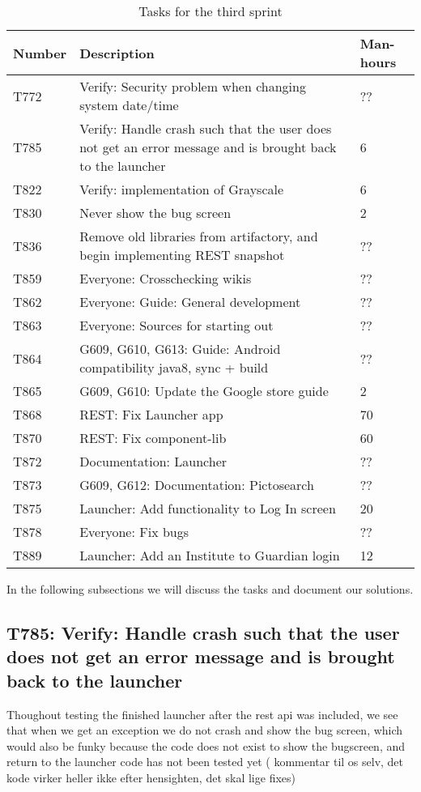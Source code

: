 \begin{table}[H]
\begin{centering}
\begin{tabular}{|l|p{9cm}|l|}
\hline
Number 	& Description & Man-hours \\ \hline
T772    & Verify: Security problem when changing system date/time & ??\\\hline
T785	& Verify: Handle crash such that the user does not get an error message and
is brought back to the launcher & 6\\ \hline
T822    & Verify: implementation of Grayscale & 6\\\hline
T830    & Never show the bug screen & 2 \\\hline
T836	& Remove old libraries from artifactory, and begin implementing REST
snapshot & ??\\\hline
T859   	& Everyone: Crosschecking wikis & ??\\\hline
T862  	& Everyone: Guide: General development & ?? \\ \hline
T863	& Everyone: Sources for starting out & ??\\ \hline
T864	& G609, G610, G613: Guide: Android compatibility java8, sync + build & ??\\
\hline 
T865	& G609, G610: Update the Google store guide & 2\\\hline
T868    & REST: Fix Launcher app & 70 \\\hline
T870    & REST: Fix component-lib & 60\\\hline
T872 	& Documentation: Launcher & ??\\ \hline
T873 	& G609, G612: Documentation: Pictosearch & ??\\ \hline
T875 	& Launcher: Add functionality to Log In screen & 20\\\hline 
T878 	& Everyone: Fix bugs & ??\\ \hline
T889	& Launcher: Add an Institute to Guardian login & 12 \\\hline
\end{tabular}
\caption{Tasks for the third sprint}
\label{Tasks3}
\end{centering}
\end{table}

In the following subsections we will discuss the tasks and document our
solutions.

\subsection{T785: Verify: Handle crash such that the user does not get an error message and
is brought back to the launcher}
Thoughout testing the finished launcher after the rest api was included, we see
that when we get an exception we do not crash and show the bug screen, which
would also be funky because the code does not exist to show the bugscreen, and
return to the launcher code has not been tested yet ( kommentar til os selv,
det kode virker heller ikke efter hensighten, det skal lige fixes)

